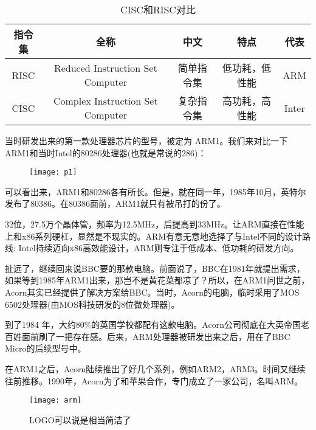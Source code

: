 \documentclass[utf8]{book}
\begin{document}
	\begin{table}[H]
	\caption{\small{CISC和RISC对比}}
	\centering
	\begin{tabular}{ccccc}
		\hline
		\rowcolor{lightgray}
		\textbf{{\small 指令集}} & \textbf{{\small 全称}} & \textbf{{\small 中文}} & \textbf{{\small 特点}} & \textbf{{\small 代表}} \\
		\hline
		{\small RISC} & {\small Reduced Instruction Set Computer} & {\small 简单指令集} & {\small 低功耗，低性能} & {\small ARM} \\
		
		{\small CISC} & {\small Complex Instruction Set Computer} & {\small 复杂指令集} & {\small 高功耗，高性能} & {\small Inter}\\
		
		\hline
		\end{tabular}
	\end{table}

	当时研发出来的第一款处理器芯片的型号，被定为 ARM1。我们来对比一下ARM1和当时Intel的80286处理器(也就是常说的286)：

	\begin{figure}[H]
		\centering
		\texttt{[image: p1]}
	\end{figure}

	可以看出来，ARM1和80286各有所长。但是，就在同一年，1985年10月，英特尔发布了80386。在80386面前，ARM1就只有被吊打的份了。


	32位，27.5万个晶体管，频率为12.5MHz，后提高到33MHz。让ARM直接在性能上和x86系列硬杠，显然是不现实的。ARM有意无意地选择了与Intel不同的设计路线: Intel持续迈向x86高效能设计，ARM则专注于低成本、低功耗的研发方向。

	扯远了，继续回来说BBC要的那款电脑。前面说了，BBC在1981年就提出需求，如果等到1985年ARM1出来，那岂不是黄花菜都凉了？所以，在ARM1问世之前，Acorn其实已经提供了解决方案给BBC。当时，Acorn的电脑，临时采用了MOS 6502处理器(由MOS科技研发的8位微处理器)。


	到了1984 年，大约80\%的英国学校都配有这款电脑。Acorn公司彻底在大英帝国老百姓面前刷了一把存在感。后来，ARM处理器被研发出来之后，用在了BBC Micro的后续型号中。

	在ARM1之后，Acorn陆续推出了好几个系列，例如ARM2，ARM3。时间又继续往前推移。1990年，Acorn为了和苹果合作，专门成立了一家公司，名叫ARM。

	\begin{figure}[H]
	\centering
	\texttt{[image: arm]}
	\caption{LOGO可以说是相当简洁了}
	\end{figure}
	
\end{document}
